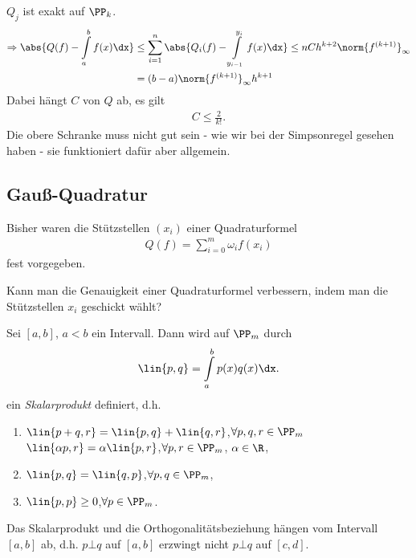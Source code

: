 \begin{bemn}[Voraussetzung.]
$Q_j$ ist exakt auf $\PP_k$.
\begin{align*}
\Rightarrow \abs{Q(f)-\int\limits_a^b f(x)\dx} &\le \sum\limits_{i=1}^n
\abs{Q_i(f)-\int\limits_{y_{i-1}}^{y_i} f(x)\dx}
\le nCh^{k+2}\norm{f^{(k+1)}}_\infty \\ &= (b-a)\norm{f^{(k+1)}}_\infty
h^{k+1}
\end{align*}
Dabei hängt $C$ von $Q$ ab, es gilt
\begin{align*}
C \le \frac{2}{k!}.
\end{align*}
Die obere Schranke muss nicht gut sein - wie wir bei der Simpsonregel gesehen
haben - sie funktioniert dafür aber allgemein.
\end{bemn} 

\subsection{Gauß-Quadratur}

Bisher waren die Stützstellen $(x_i)$ einer Quadraturformel
\begin{align*}
Q(f) = \sum\limits_{i=0}^m \omega_i f(x_i)
\end{align*}
fest vorgegeben.

\begin{bemn}[Frage:]
Kann man die Genauigkeit einer Quadraturformel verbessern, indem man die
Stützstellen $x_i$ geschickt wählt?
\end{bemn}

\begin{defnn}[Hilfsmittel]
Sei $[a,b]$, $a<b$ ein Intervall. Dann wird auf $\PP_m$ durch
\begin{align*}
\lin{p,q} = \int\limits_a^b p(x)q(x)\dx.
\end{align*}
ein \emph{Skalarprodukt} definiert, d.h.
\begin{enumerate}[label=(\roman{*})]
\item $\lin{p+q,r} = \lin{p,q}+\lin{q,r}$,\quad $\forall p,q,r\in\PP_m$\\
$\lin{\alpha p,r} = \alpha\lin{p,r}$,\quad $\forall p,r\in\PP_m$, $\alpha\in\R$,
\item $\lin{p,q}=\lin{q,p}$,\quad $\forall p,q\in\PP_m$,
\item $\lin{p,p} \ge 0$,\quad $\forall p\in\PP_m$.\fishhere
\end{enumerate}
\end{defnn}
Das Skalarprodukt und die Orthogonalitätsbeziehung hängen vom Intervall $[a,b]$
ab, d.h. $p\bot q$ auf $[a,b]$ erzwingt nicht $p\bot q$ auf $[c,d]$.